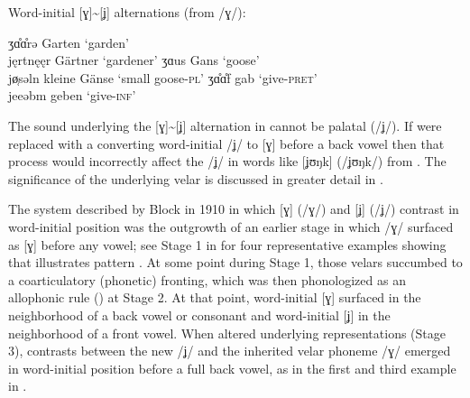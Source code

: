 \ea%
\label{ex:8:17}Word-initial [ɣ]{\textasciitilde}[ʝ] alternations (from /ɣ/):

\ea\label{ex:8:17a}  ʒɑ̊ɑ̊rə \tab  [ɣɑːrə] \tab Garten \tab ‘garden’ \\
     jęrtnęęr \tab [ʝɛrtnɛːr] \tab Gärtner \tab ‘gardener’ 
\ex\label{ex:8:17b}  ʒɑus \tab  [ɣɑus] \tab Gans \tab ‘goose’ \\
     jø̜səln \tab [ʝœsəln] \tab kleine Gänse \tab ‘small goose-\textsc{pl}’ 
\ex\label{ex:8:17c}  ʒɑ̊ɑ̊f \tab  [ɣɑːf] \tab gab \tab ‘give\textsc{{}-pret}’ \\
     jeeəbm \tab [ʝeːəbm̩] \tab geben \tab ‘give\textsc{{}-inf}’ 
   \z
\z 

The sound underlying the [ɣ]{\textasciitilde}[ʝ] alternation in  cannot be palatal (/ʝ/). If  were replaced with a  converting word-initial /ʝ/ to [ɣ] before a back vowel then that process would incorrectly affect the /ʝ/ in words like [ʝʊŋk]  (/ʝʊŋk/) from . The significance of the underlying velar is discussed in greater detail in .

The system described by Block in 1910 in which [ɣ] (/ɣ/) and [ʝ] (/ʝ/) contrast in word-initial position was the outgrowth of an earlier stage in which /ɣ/ surfaced as [ɣ] before any vowel; see Stage 1 in  for four representative examples showing that  illustrates pattern . At some point during Stage 1, those velars succumbed to a coarticulatory (phonetic) fronting, which was then phonologized as an allophonic rule () at Stage 2. At that point, word-initial [ɣ] surfaced in the neighborhood of a back vowel or consonant and word-initial [ʝ] in the neighborhood of a front vowel. When  altered underlying representations (Stage 3), contrasts between the new  /ʝ/ and the inherited velar phoneme /ɣ/ emerged in word-initial position before a full back vowel, as in the first and third example in .

